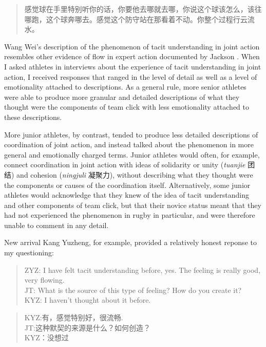 \begin{CJK}{UTF8}{gbsn}
  \begin{quotation}
    	感觉球在手里特别听你的话，你要他去哪就去哪，你说这个球该怎么，该往哪跑，这个球奔哪去。感觉这个防守站在那看着不动。你整个过程行云流水。
  \end{quotation}

Wang Wei's description of the phenomenon of tacit understanding in joint action resembles other evidence of flow in expert action documented by Jackson \textcite{Jackson1992}.  When I asked athletes in interviews about the experience of tacit understanding in joint action, I received responses that ranged in the level of detail as well as a level of emotionality attached to descriptions.  As a general rule, more senior athletes were able to produce more granular and detailed descriptions of what they thought were the components of team click with less emotionality attached to these descriptions.

More junior athletes, by contrast, tended to produce less detailed descriptions of coordination of joint action, and instead talked about the phenomenon in more general and emotionally charged terms. Junior athletes would often, for example, connect coordination in joint action with ideas of solidarity or unity (\textit{tuanjie} 团结) and cohesion (\textit{ningjuli} 凝聚力), without describing what they thought were the components or causes of the coordination itself.  Alternatively, some junior athletes would acknowledge that they knew of the idea of tacit understanding and other components of team click, but that their novice status meant that they had not experienced the phenomenon in rugby in particular, and were therefore unable to comment in any detail.

New arrival Kang Yuzheng, for example, provided a relatively honest reponse to my questioning:

\begin{quotation}
  ZYZ: I have felt tacit understanding before, yes.  The feeling is really good, very flowing. \\
  JT: What is the source of this type of feeling? How do you create it? \\
  KYZ: I haven't thought about it before.
\end{quotation}

\begin{quotation}
  KYZ:有，感觉特别好，很流畅. \\
  JT:这种默契的来源是什么？如何创造？\\
  KYZ：没想过
\end{quotation}



\end{CJK}
